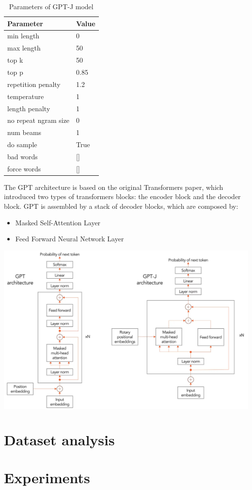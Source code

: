 \documentclass{article}
\begin{document}
\begin{table}[h] 
\centering
\begin{tabular}{|l|l|}
\hline
Parameter          & Value \\ \hline
min length         & 0    \\ 
max length         & 50    \\ 
top k              & 50    \\
top p              & 0.85  \\
repetition penalty & 1.2   \\
temperature        & 1     \\
length penalty     & 1     \\
no repeat ngram size     & 0     \\
num beams &  1 \\
do sample & True \\
bad words & [\space] \\
force words & [\space] \\ \hline
\end{tabular}
\caption{Parameters of GPT-J model}\label{table:parametersGPTJTable}
\end{table}

The GPT architecture is based on the original Transformers paper, which introduced two types of transformers blocks: the encoder block and the decoder block. GPT is assembled by a stack of decoder blocks, which are composed by:
\begin{itemize}
    \item Masked Self-Attention Layer
    \item Feed Forward Neural Network Layer
\end{itemize}

\includegraphics[width=\textwidth]{GPT-vs-GPT-J-uai-1440x933.jpg}


\section{Dataset analysis}


\section{Experiments}

    
\end{document}
